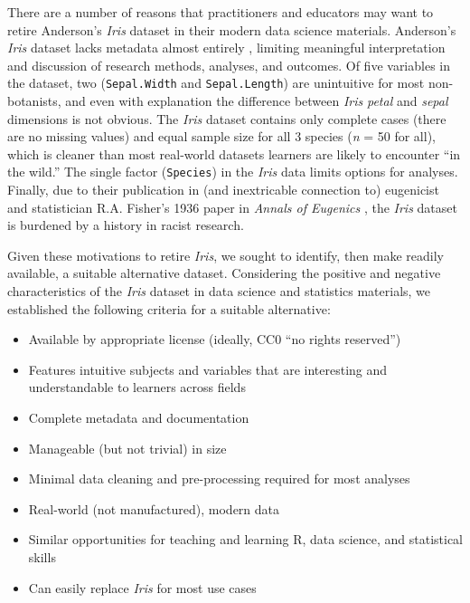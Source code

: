 There are a number of reasons that practitioners and educators may want
to retire Anderson's \emph{Iris} dataset in their modern data science
materials. Anderson's \emph{Iris} dataset lacks metadata almost entirely
\citep{anderson_irises_1935}, limiting meaningful interpretation and
discussion of research methods, analyses, and outcomes. Of five
variables in the dataset, two (\texttt{Sepal.Width} and
\texttt{Sepal.Length}) are unintuitive for most non-botanists, and even
with explanation the difference between \emph{Iris} \emph{petal} and
\emph{sepal} dimensions is not obvious. The \emph{Iris} dataset contains
only complete cases (there are no missing values) and equal sample size
for all 3 species (\emph{n} = 50 for all), which is cleaner than most
real-world datasets learners are likely to encounter ``in the wild.''
The single factor (\texttt{Species}) in the \emph{Iris} data limits
options for analyses. Finally, due to their publication in (and
inextricable connection to) eugenicist and statistician R.A. Fisher's
1936 paper in \emph{Annals of Eugenics} \citep{fisher_use_1936}, the
\emph{Iris} dataset is burdened by a history in racist research.

Given these motivations to retire \emph{Iris}, we sought to identify,
then make readily available, a suitable alternative dataset. Considering
the positive and negative characteristics of the \emph{Iris} dataset in
data science and statistics materials, we established the following
criteria for a suitable alternative:

\begin{itemize}
\tightlist
\item
  Available by appropriate license (ideally, CC0 ``no rights reserved'')
\item
  Features intuitive subjects and variables that are interesting and
  understandable to learners across fields
\item
  Complete metadata and documentation
\item
  Manageable (but not trivial) in size
\item
  Minimal data cleaning and pre-processing required for most analyses
\item
  Real-world (not manufactured), modern data
\item
  Similar opportunities for teaching and learning R, data science, and
  statistical skills
\item
  Can easily replace \emph{Iris} for most use cases
\end{itemize}


